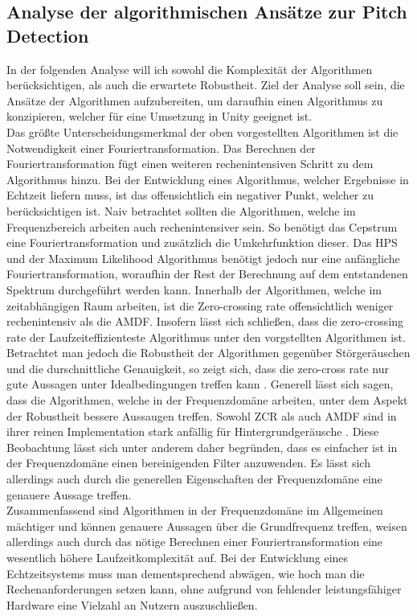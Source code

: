 \subsection{Analyse der algorithmischen Ansätze zur Pitch Detection}
\label{sec:analyse_echtzeit}
In der folgenden Analyse will ich sowohl die Komplexität der Algorithmen berücksichtigen, als auch die erwartete Robustheit. Ziel der Analyse soll sein, die Ansätze der Algorithmen aufzubereiten, um daraufhin einen Algorithmus zu konzipieren, welcher für eine Umsetzung in Unity geeignet ist. \\
Das größte Unterscheidungsmerkmal der oben vorgestellten Algorithmen ist die Notwendigkeit einer Fouriertransformation. Das Berechnen der Fouriertransformation fügt einen weiteren rechenintensiven Schritt zu dem Algorithmus hinzu. Bei der Entwicklung eines Algorithmus, welcher Ergebnisse in Echtzeit liefern muss, ist das offensichtlich ein negativer Punkt, welcher zu berücksichtigen ist. Naiv betrachtet sollten die Algorithmen, welche im Frequenzbereich arbeiten auch rechenintensiver sein. So benötigt das Cepstrum eine Fouriertransformation und zusätzlich die Umkehrfunktion dieser. Das HPS und der Maximum Likelihood Algorithmus benötigt jedoch nur eine anfängliche Fouriertransformation, woraufhin der Rest der Berechnung auf dem entstandenen Spektrum durchgeführt werden kann. Innerhalb der Algorithmen, welche im zeitabhängigen Raum arbeiten, ist die Zero-crossing rate offensichtlich weniger rechenintensiv als die AMDF. Insofern lässt sich schließen, dass die zero-crossing rate der Laufzeiteffizienteste Algorithmus unter den vorgstellten Algorithmen ist. Betrachtet man jedoch die Robustheit der Algorithmen gegenüber Störgeräuschen und die durschnittliche Genauigkeit, so zeigt sich, dass die zero-cross rate nur gute Aussagen unter Idealbedingungen treffen kann \cite{amado2008pitch}. Generell lässt sich sagen, dass die Algorithmen, welche in der Frequenzdomäne arbeiten, unter dem Aspekt der Robustheit bessere Aussaugen treffen. Sowohl ZCR als auch AMDF sind in ihrer reinen Implementation stark anfällig für Hintergrundgeräusche \cite{cuadra2001hps}. Diese Beobachtung lässt sich unter anderem daher begründen, dass es einfacher ist in der Frequenzdomäne einen bereinigenden Filter anzuwenden. Es lässt sich allerdings auch durch die generellen Eigenschaften der Frequenzdomäne eine genauere Aussage treffen. \\
Zusammenfassend sind Algorithmen in der Frequenzdomäne im Allgemeinen mächtiger und können genauere Aussagen über die Grundfrequenz treffen, weisen allerdings auch durch das nötige Berechnen einer Fouriertransformation eine wesentlich höhere Laufzeitkomplexität auf. Bei der Entwicklung eines Echtzeitsystems muss man dementsprechend abwägen, wie hoch man die Rechenanforderungen setzen kann, ohne aufgrund von fehlender leistungsfähiger Hardware eine Vielzahl an Nutzern auszuschließen. 

